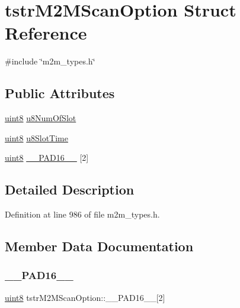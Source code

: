 \hypertarget{structtstrM2MScanOption}{}\section{tstr\+M2\+M\+Scan\+Option Struct Reference}
\label{structtstrM2MScanOption}


{\ttfamily \#include \char`\"{}m2m\+\_\+types.\+h\char`\"{}}

\subsection*{Public Attributes}
\begin{DoxyCompactItemize}
\item 
\hyperlink{group__DataT_ga4df709a77647e870bbf1d955b8edc9a6}{uint8} \hyperlink{structtstrM2MScanOption_afea8abd511d36669abe3f62db32448fd}{u8\+Num\+Of\+Slot}
\item 
\hyperlink{group__DataT_ga4df709a77647e870bbf1d955b8edc9a6}{uint8} \hyperlink{structtstrM2MScanOption_a059c3a0366f0f96c3ad371edf7ebee43}{u8\+Slot\+Time}
\item 
\hyperlink{group__DataT_ga4df709a77647e870bbf1d955b8edc9a6}{uint8} \hyperlink{structtstrM2MScanOption_a4a69d8873a23ac6efad52c7e89c7f8f4}{\+\_\+\+\_\+\+P\+A\+D16\+\_\+\+\_\+} \mbox{[}2\mbox{]}
\end{DoxyCompactItemize}


\subsection{Detailed Description}


Definition at line 986 of file m2m\+\_\+types.\+h.



\subsection{Member Data Documentation}
\mbox{\label{structtstrM2MScanOption_a4a69d8873a23ac6efad52c7e89c7f8f4}} 
\subsubsection{\texorpdfstring{\+\_\+\+\_\+\+P\+A\+D16\+\_\+\+\_\+}{\_\_PAD16\_\_}}
{\footnotesize\ttfamily \hyperlink{group__DataT_ga4df709a77647e870bbf1d955b8edc9a6}{uint8} tstr\+M2\+M\+Scan\+Option\+::\+\_\+\+\_\+\+P\+A\+D16\+\_\+\+\_\+\mbox{[}2\mbox{]}}



